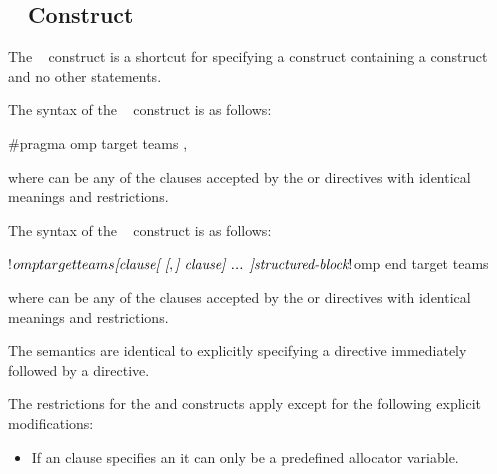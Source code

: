 \subsection{~ Construct}
\label{subsec:target teams Construct}
\summary
The ~ construct is a shortcut for specifying a  construct
containing a  construct and no other statements.

\syntax
\begin{ccppspecific}
The syntax of the ~ construct is as follows:

\begin{ompcPragma}
#pragma omp target teams \plc{[clause[ [},\plc{] clause] ... ] new-line}
\end{ompcPragma}

where  can be any of the clauses accepted by the  or  directives
with identical meanings and restrictions.
\end{ccppspecific}

\begin{fortranspecific}
The syntax of the ~ construct is as follows:

\begin{ompfPragma}
!$omp target teams \plc{[clause[ [},\plc{] clause] ... ]}
    \plc{structured-block}
!$omp end target teams
\end{ompfPragma}

where  can be any of the clauses accepted by the  or  directives
with identical meanings and restrictions.
\end{fortranspecific}

\descr

The semantics are identical to explicitly specifying a  directive
immediately followed by a  directive.

\restrictions
The restrictions for the  and  constructs apply except for the following explicit modifications:

\begin{itemize}

\item If an  clause specifies an  it can only be a predefined allocator variable.

\end{itemize}

